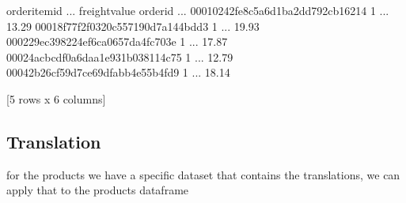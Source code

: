 \documentclass[letterpaper,10pt,english]{jupyterBook}
\begin{document}
\begin{sphinxVerbatim}[commandchars=\\\{\}]
  
\end{sphinxVerbatim}

\begin{sphinxVerbatim}[commandchars=\\\{\}]
                                  order\PYGZus{}item\PYGZus{}id  ... freight\PYGZus{}value
order\PYGZus{}id                                         ...              
00010242fe8c5a6d1ba2dd792cb16214              1  ...         13.29
00018f77f2f0320c557190d7a144bdd3              1  ...         19.93
000229ec398224ef6ca0657da4fc703e              1  ...         17.87
00024acbcdf0a6daa1e931b038114c75              1  ...         12.79
00042b26cf59d7ce69dfabb4e55b4fd9              1  ...         18.14

[5 rows x 6 columns]
\end{sphinxVerbatim}


\subsection{Translation}
\label{\detokenize{c7_case_studies/Olist:translation}}
\sphinxAtStartPar
for the products we have a specific dataset that contains the translations, we can apply that to the products dataframe

\begin{sphinxVerbatim}[commandchars=\\\{\}]
    \PYG{p}{[}\PYG{p}{]}
\PYG{p}{[}\PYG{p}{]}  \PYG{p}{[}\PYG{p}{]}
\end{sphinxVerbatim}
\end{document}
